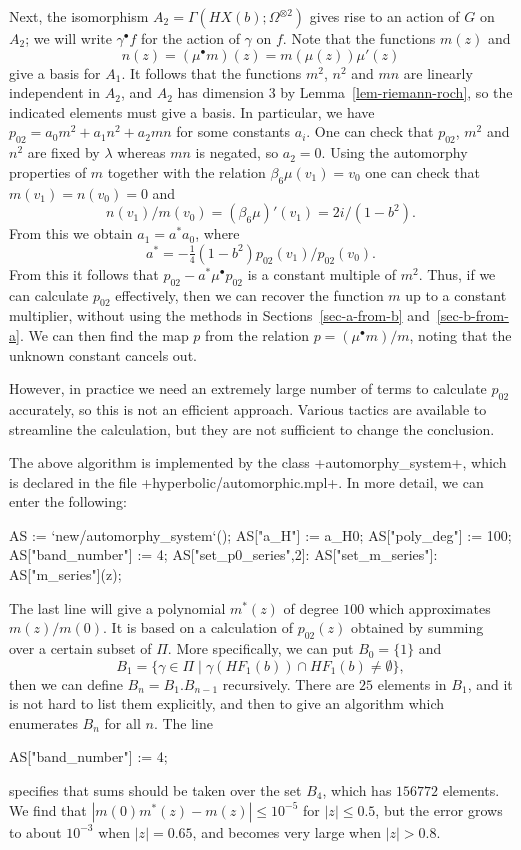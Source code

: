 \documentclass[reqno]{amsart}
\newcommand{\Om}        {\Omega}
\newcommand{\bt}        {\beta}
\newcommand{\gm}        {\gamma}
\newcommand{\lm}        {\lambda}
\newcommand{\st}        {\;|\;}
\newcommand{\ot}        {\otimes}
\renewcommand{\:}{\colon}
\theoremstyle{definition}
\begin{document}
Next, the isomorphism $A_2=\Gamma(HX(b);\Om^{\ot 2})$ gives rise to an
action of $G$ on $A_2$; we will write $\gm^\bullet f$ for the action
of $\gm$ on $f$.  Note that the functions $m(z)$ and
\[ n(z) = (\mu^\bullet m)(z) = m(\mu(z))\mu'(z) \]
give a basis for $A_1$.  It follows that the functions $m^2$, $n^2$
and $mn$ are linearly independent in $A_2$, and $A_2$ has dimension
$3$ by Lemma~\ref{lem-riemann-roch}, so the indicated elements must
give a basis.  In particular, we have $p_{02}=a_0m^2+a_1n^2+a_2mn$ for
some constants $a_i$.  One can check that $p_{02}$, $m^2$ and $n^2$
are fixed by $\lm$ whereas $mn$ is negated, so $a_2=0$.  Using the
automorphy properties of $m$ together with the relation
$\bt_6\mu(v_1)=v_0$ one can check that $m(v_1)=n(v_0)=0$ and
\[ n(v_1)/m(v_0) = (\bt_6\mu)'(v_1) = 2i/(1-b^2). \]
From this we obtain $a_1=a^*a_0$, where
\[ a^* = -\tfrac{1}{4}(1-b^2) p_{02}(v_1)/p_{02}(v_0). \]
From this it follows that $p_{02}-a^*\mu^\bullet p_{02}$ is a constant
multiple of $m^2$.  Thus, if we can calculate $p_{02}$ effectively,
then we can recover the function $m$ up to a constant multiplier,
without using the methods in Sections~\ref{sec-a-from-b}
and~\ref{sec-b-from-a}.  We can then find the map $p$ from the
relation $p=(\mu^\bullet m)/m$, noting that the unknown constant
cancels out.

However, in practice we need an extremely large number of terms to
calculate $p_{02}$ accurately, so this is not an efficient approach.
Various tactics are available to streamline the calculation, but they
are not sufficient to change the conclusion.

The above algorithm is implemented by the class
\mcode+automorphy_system+, which is declared in the file
\fname+hyperbolic/automorphic.mpl+.  In more detail, we can enter the
following:
\begin{mcodeblock}
   AS := `new/automorphy_system`();
   AS["a_H"] := a_H0;
   AS["poly_deg"] := 100;
   AS["band_number"] := 4;
   AS["set_p0_series",2]:
   AS["set_m_series"]:
   AS["m_series"](z);
\end{mcodeblock}
The last line will give a polynomial $m^*(z)$ of degree $100$ which
approximates $m(z)/m(0)$.  It is based on a calculation of $p_{02}(z)$
obtained by summing over a certain subset of $\Pi$.  More
specifically, we can put $B_0=\{1\}$ and
\[ B_1 = \{\gm\in\Pi \st \gm(HF_1(b))\cap HF_1(b)\neq\emptyset\}, \]
then we can define $B_n=B_1.B_{n-1}$ recursively.  There are $25$
elements in $B_1$, and it is not hard to list them explicitly, and
then to give an algorithm which enumerates $B_n$ for all $n$.  The
line
\begin{mcodeblock}
   AS["band_number"] := 4;
\end{mcodeblock}
specifies that sums should be taken over the set $B_4$, which has
$156772$ elements.  We find that $|m(0)m^*(z)-m(z)|\leq 10^{-5}$ for
$|z|\leq 0.5$, but the error grows to about $10^{-3}$ when $|z|=0.65$,
and becomes very large when $|z|>0.8$.
\end{document}
